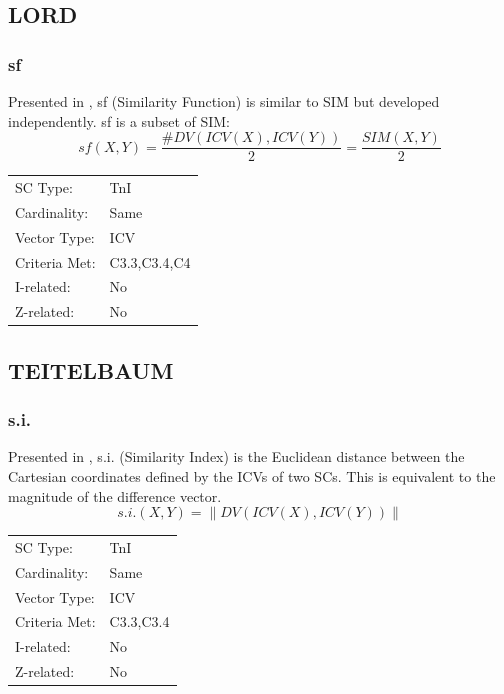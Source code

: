 \documentclass{article}
\begin{document}
\subsection{LORD}
\label{sec-11-3}
\subsubsection{sf}
\label{sec-11-3-1}

Presented in \cite[pp. 93]{Lord1981}, sf (Similarity Function) is
similar to SIM but developed independently. sf is a subset of SIM:
$$sf\left(X,Y\right)=\frac{\#DV\left(ICV\left(X\right),ICV\left(Y\right)\right)}{2}=\frac{SIM(X,Y)}{2}$$

\begin{center}
\begin{tabular}{ll}
 SC Type:       &  TnI           \\
 Cardinality:   &  Same          \\
 Vector Type:   &  ICV           \\
 Criteria Met:  &  C3.3,C3.4,C4  \\
 I-related:     &  No            \\
 Z-related:     &  No            \\
\end{tabular}
\end{center}
\subsection{TEITELBAUM}
\label{sec-11-4}
\subsubsection{s.i.}
\label{sec-11-4-1}

Presented in \citet[pp. 88]{Teitelbaum1965}, s.i. (Similarity Index)
is the Euclidean distance between the Cartesian coordinates defined
by the ICVs of two SCs. This is equivalent to the magnitude of the
difference vector. $$s.i.(X,Y)=\left\|DV(ICV(X),ICV(Y))\right\|$$

\begin{center}
\begin{tabular}{ll}
 SC Type:       &  TnI        \\
 Cardinality:   &  Same       \\
 Vector Type:   &  ICV        \\
 Criteria Met:  &  C3.3,C3.4  \\
 I-related:     &  No         \\
 Z-related:     &  No         \\
\end{tabular}
\end{center}
\end{document}

